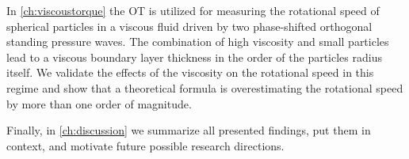 In \cref{ch:viscoustorque} the OT is utilized for measuring the rotational 
speed of spherical particles in a viscous fluid driven by two phase-shifted 
orthogonal standing pressure waves. The combination of high viscosity and small 
particles lead to a viscous boundary layer thickness in the order of the 
particles radius itself. We validate the effects of the viscosity on the 
rotational speed in this regime and show that a theoretical formula is 
overestimating the rotational speed by more than one order of magnitude.

Finally, in \cref{ch:discussion} we summarize all presented findings, put them 
in context, and motivate future possible research directions.
